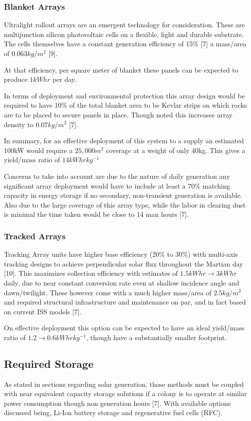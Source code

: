 \documentclass[12pt]{IEEEtran}
\begin{document}
\subsubsection*{Blanket Arrays} 
Ultralight rollout arrays are an emergent technology for consideration. These are multijunction silicon photovoltaic cells on a flexible, light and durable substrate. The cells themselves have a constant generation efficiency of 15\% [7] a mass/area of $0.063 kg/m^{2}$ [9].

At that efficiency, per square meter of blanket these panels can be expected to produce $1 kWhr$ per day.

In terms of deployment and environmental protection this array design would be required to have 10\% of the total blanket area to be Kevlar strips on which rocks are to be placed to secure panels in place.
Though noted this increases array density to $0.07 kg/m^{2}$ [7].

In summary, for an effective deployment of this system to a supply an estimated 100kW would require a $25,000m^{2}$ coverage at a weight of only 40kg. This gives a yield/mass ratio of $14kWhr kg^{-1}$

Concerns to take into account are due to the nature of daily generation any significant array deployment would have to include at least a 70\% matching capacity in energy storage if no secondary, non-transient generation is available. Also due to the large coverage of this array type, while the labor in clearing dust is minimal the time taken would be close to 14 man hours [7].
\subsubsection*{Tracked Arrays}
Tracking Array units have higher base efficiency (20\% to 30\%) with multi-axis tracking designs to achieve perpendicular solar flux throughout the Martian day [10]. This maximizes collection efficiency with estimates of  $1.5 kWhr \rightarrow 3 kWhr$ daily, due to near constant conversion rate even at shallow incidence angle and dawn/twilight. These however come with a much higher mass/area of $2.5 kg/m^{2}$ and required structural infrastructure and maintenance on par, and in fact based on current ISS models [7].

On effective deployment this option can be expected to have an ideal yield/mass ratio of $1.2 \rightarrow 0.6 kWhr kg^{-1}$, though have a substantially smaller footprint.

\subsection*{Required Storage}
As stated in sections regarding solar generation, those methods must be coupled with near equivalent capacity storage solutions if a colony is to operate at similar power consumption though non generation hours [7]. With available options discussed being, Li-Ion battery storage and regenerative fuel cells (RFC).
\end{document}
